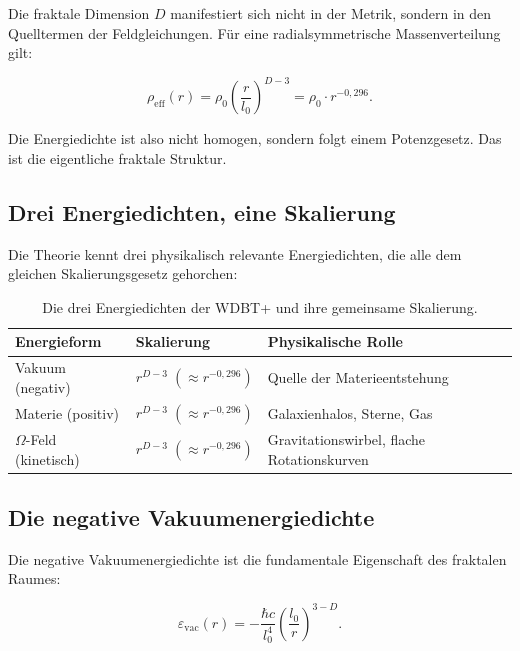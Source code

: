 \documentclass[12pt,a4paper]{article}
\begin{document}
Die fraktale Dimension \(D\) manifestiert sich nicht in der Metrik, sondern in den Quelltermen der Feldgleichungen. Für eine radialsymmetrische Massenverteilung gilt:

\begin{equation}
\rho_{\text{eff}}(r) = \rho_0 \left( \frac{r}{l_0} \right)^{D-3} = \rho_0 \cdot r^{-0,296}.
\end{equation}

Die Energiedichte ist also nicht homogen, sondern folgt einem Potenzgesetz. Das ist die eigentliche fraktale Struktur.

\subsection{Drei Energiedichten, eine Skalierung}

Die Theorie kennt drei physikalisch relevante Energiedichten, die alle dem gleichen Skalierungsgesetz gehorchen:

\begin{table}[h]
\centering
\small
\setlength{\tabcolsep}{4pt}
\begin{tabular}{|p{2.8cm}|p{3.0cm}|p{3.8cm}|}
\hline
\textbf{Energieform} & \textbf{Skalierung} & \textbf{Physikalische Rolle} \\
\hline
Vakuum (negativ) & 
\(r^{D-3} \;( \approx r^{-0,296})\) & 
Quelle der Materieentstehung \\
\hline
Materie (positiv) & 
\(r^{D-3} \;( \approx r^{-0,296})\) & 
Galaxienhalos, Sterne, Gas \\
\hline
\(\Omega\)-Feld (kinetisch) & 
\(r^{D-3} \;( \approx r^{-0,296})\) & 
Gravitationswirbel, flache Rotationskurven \\
\hline
\end{tabular}
\caption{Die drei Energiedichten der WDBT+ und ihre gemeinsame Skalierung.}
\label{tab:energiedichten}
\end{table}

\subsection{Die negative Vakuumenergiedichte}

Die negative Vakuumenergiedichte ist die fundamentale Eigenschaft des fraktalen Raumes:

\begin{equation}
\varepsilon_{\text{vac}}(r) = -\frac{\hbar c}{l_0^4} \left( \frac{l_0}{r} \right)^{3-D}.
\end{equation}
\end{document}
